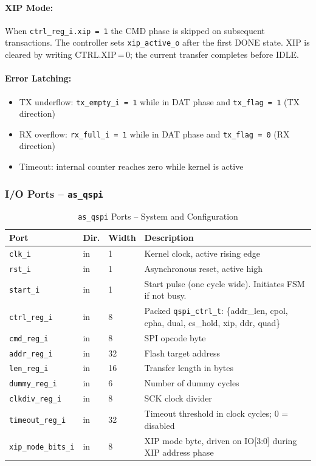 \paragraph{XIP Mode:}
When \texttt{ctrl\_reg\_i.xip = 1} the CMD phase is skipped on subsequent
transactions. The controller sets \texttt{xip\_active\_o} after the first
DONE state. XIP is cleared by writing CTRL.XIP\,=\,0; the current transfer
completes before IDLE.

\paragraph{Error Latching:}
\begin{itemize}
  \item TX underflow: \texttt{tx\_empty\_i = 1} while in DAT phase and
    \texttt{tx\_flag = 1} (TX direction)
  \item RX overflow: \texttt{rx\_full\_i = 1} while in DAT phase and
    \texttt{tx\_flag = 0} (RX direction)
  \item Timeout: internal counter reaches zero while kernel is active
\end{itemize}

\subsubsection{I/O Ports -- \texttt{as\_qspi}}

\begin{table}[H]
\caption{\texttt{as\_qspi} Ports -- System and Configuration}
\label{tab:asqspi_ports1}
\centering
\begin{tabularx}{\textwidth}{|l|l|l|X|}
  \hline
  Port & Dir. & Width & Description \\
  \hline\hline
  \texttt{clk\_i}           & in  & 1  & Kernel clock, active rising edge \\
  \hline
  \texttt{rst\_i}           & in  & 1  & Asynchronous reset, active high \\
  \hline
  \texttt{start\_i}         & in  & 1  & Start pulse (one cycle wide). Initiates FSM if not busy. \\
  \hline
  \texttt{ctrl\_reg\_i}     & in  & 8  & Packed \texttt{qspi\_ctrl\_t}: \{addr\_len, cpol, cpha, dual, cs\_hold, xip, ddr, quad\} \\
  \hline
  \texttt{cmd\_reg\_i}      & in  & 8  & SPI opcode byte \\
  \hline
  \texttt{addr\_reg\_i}     & in  & 32 & Flash target address \\
  \hline
  \texttt{len\_reg\_i}      & in  & 16 & Transfer length in bytes \\
  \hline
  \texttt{dummy\_reg\_i}    & in  & 6  & Number of dummy cycles \\
  \hline
  \texttt{clkdiv\_reg\_i}   & in  & 8  & SCK clock divider \\
  \hline
  \texttt{timeout\_reg\_i}  & in  & 32 & Timeout threshold in clock cycles; 0 = disabled \\
  \hline
  \texttt{xip\_mode\_bits\_i}& in & 8  & XIP mode byte, driven on IO[3:0] during XIP address phase \\
  \hline
\end{tabularx}
\end{table}

